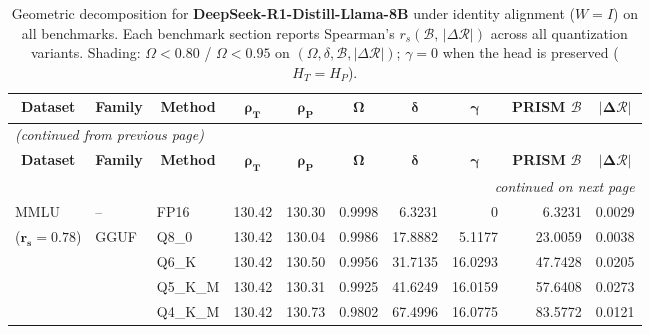 \begingroup
\small
\setlength{\tabcolsep}{4pt}
\renewcommand{\arraystretch}{1.05}
\setlength{\LTcapwidth}{\textwidth}
\begin{longtable}{ll l rrrrrrr}
\caption{Geometric decomposition for \textbf{DeepSeek-R1-Distill-Llama-8B} under identity alignment ($W{=}I$) on all benchmarks. Each benchmark section reports Spearman's $r_s(\mathcal{B},\,|\Delta\mathcal{R}|)$ across all quantization variants. Shading: \colorbox{red!35}{$\Omega{<}0.80$} / \colorbox{red!18}{$\Omega{<}0.95$} on $(\Omega,\delta,\mathcal{B},|\Delta\mathcal{R}|)$; \colorbox{cyan!12}{$\gamma{=}0$} when the head is preserved ($H_T{=}H_P$).}\label{tab:deepseek_decomposition_all_bound}\\
\toprule
\multicolumn{1}{c}{\textbf{Dataset}} & \multicolumn{1}{c}{\textbf{Family}} & \multicolumn{1}{c}{\textbf{Method}} & \multicolumn{1}{c}{$\boldsymbol{\rho_T}$} & \multicolumn{1}{c}{$\boldsymbol{\rho_P}$} & \multicolumn{1}{c}{$\boldsymbol{\Omega}$} & \multicolumn{1}{c}{$\boldsymbol{\delta}$} & \multicolumn{1}{c}{$\boldsymbol{\gamma}$} & \multicolumn{1}{c}{\textbf{PRISM} $\boldsymbol{\mathcal{B}}$} & \multicolumn{1}{c}{$\boldsymbol{|\Delta\mathcal{R}|}$} \\
\midrule
\endfirsthead
\multicolumn{10}{l}{\small\itshape (continued from previous page)}\\
\toprule
\multicolumn{1}{c}{\textbf{Dataset}} & \multicolumn{1}{c}{\textbf{Family}} & \multicolumn{1}{c}{\textbf{Method}} & \multicolumn{1}{c}{$\boldsymbol{\rho_T}$} & \multicolumn{1}{c}{$\boldsymbol{\rho_P}$} & \multicolumn{1}{c}{$\boldsymbol{\Omega}$} & \multicolumn{1}{c}{$\boldsymbol{\delta}$} & \multicolumn{1}{c}{$\boldsymbol{\gamma}$} & \multicolumn{1}{c}{\textbf{PRISM} $\boldsymbol{\mathcal{B}}$} & \multicolumn{1}{c}{$\boldsymbol{|\Delta\mathcal{R}|}$} \\
\midrule
\endhead
\midrule
\multicolumn{10}{r}{\small\itshape continued on next page}\\
\endfoot
\bottomrule
\endlastfoot
MMLU & -- & FP16 & 130.42 & 130.30 & 0.9998 & 6.3231 & \cellcolor{cyan!12} $0$ & 6.3231 & 0.0029 \\
{\small ($\mathbf{r_s{=}0.78}$)} & GGUF & Q8\_0 & 130.42 & 130.04 & 0.9986 & 17.8882 & 5.1177 & 23.0059 & 0.0038 \\
 &  & Q6\_K & 130.42 & 130.50 & 0.9956 & 31.7135 & 16.0293 & 47.7428 & 0.0205 \\
 &  & Q5\_K\_M & 130.42 & 130.31 & 0.9925 & 41.6249 & 16.0159 & 57.6408 & 0.0273 \\
 &  & Q4\_K\_M & 130.42 & 130.73 & 0.9802 & 67.4996 & 16.0775 & 83.5772 & 0.0121 \\

\end{longtable}
